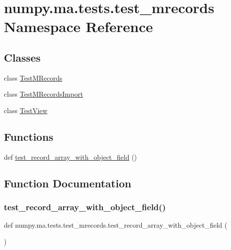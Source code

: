 \hypertarget{namespacenumpy_1_1ma_1_1tests_1_1test__mrecords}{}\section{numpy.\+ma.\+tests.\+test\+\_\+mrecords Namespace Reference}
\label{namespacenumpy_1_1ma_1_1tests_1_1test__mrecords}
\subsection*{Classes}
\begin{DoxyCompactItemize}
\item 
class \hyperlink{classnumpy_1_1ma_1_1tests_1_1test__mrecords_1_1TestMRecords}{Test\+M\+Records}
\item 
class \hyperlink{classnumpy_1_1ma_1_1tests_1_1test__mrecords_1_1TestMRecordsImport}{Test\+M\+Records\+Import}
\item 
class \hyperlink{classnumpy_1_1ma_1_1tests_1_1test__mrecords_1_1TestView}{Test\+View}
\end{DoxyCompactItemize}
\subsection*{Functions}
\begin{DoxyCompactItemize}
\item 
def \hyperlink{namespacenumpy_1_1ma_1_1tests_1_1test__mrecords_aefdb58617a27e0a62a03bd39d7bb9a18}{test\+\_\+record\+\_\+array\+\_\+with\+\_\+object\+\_\+field} ()
\end{DoxyCompactItemize}


\subsection{Function Documentation}
\mbox{\label{namespacenumpy_1_1ma_1_1tests_1_1test__mrecords_aefdb58617a27e0a62a03bd39d7bb9a18}} 
\subsubsection{\texorpdfstring{test\+\_\+record\+\_\+array\+\_\+with\+\_\+object\+\_\+field()}{test\_record\_array\_with\_object\_field()}}
{\footnotesize\ttfamily def numpy.\+ma.\+tests.\+test\+\_\+mrecords.\+test\+\_\+record\+\_\+array\+\_\+with\+\_\+object\+\_\+field (\begin{DoxyParamCaption}{ }\end{DoxyParamCaption})}


